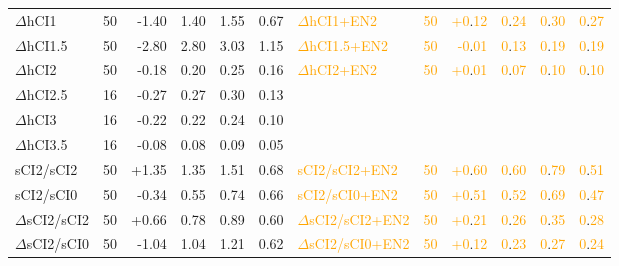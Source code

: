 \documentclass[aip,jcp,reprint,noshowkeys,superscriptaddress]{revtex4-1}
\newcommand{\fk}[1]{\textcolor{orange}{#1}}
\begin{document}
\begin{table}[ht!]
\begin{ruledtabular}
\begin{tabular}{ldddddlddddd}
%
\hline
$\Delta$hCI1      & 50  & -1.40 & 1.40 & 1.55 & 0.67  &\fk{$\Delta$hCI1+EN2}      & \fk{50}  & \fk{+0}.\fk{12}  & \fk{0}.\fk{24} & \fk{0}.\fk{30} & \fk{0}.\fk{27} \\
$\Delta$hCI1.5    & 50  & -2.80 & 2.80 & 3.03 & 1.15  &\fk{$\Delta$hCI1.5+EN2}    & \fk{50}  & \fk{-0}.\fk{01}  & \fk{0}.\fk{13} & \fk{0}.\fk{19} & \fk{0}.\fk{19} \\
$\Delta$hCI2      & 50  & -0.18 & 0.20 & 0.25 & 0.16  &\fk{$\Delta$hCI2+EN2}      & \fk{50}  & \fk{+0}.\fk{01}  & \fk{0}.\fk{07} & \fk{0}.\fk{10} & \fk{0}.\fk{10} \\
$\Delta$hCI2.5    & 16  & -0.27 & 0.27 & 0.30 & 0.13  & & & & & & \\
$\Delta$hCI3      & 16  & -0.22 & 0.22 & 0.24 & 0.10  & & & & & & \\
$\Delta$hCI3.5    & 16  & -0.08 & 0.08 & 0.09 & 0.05  & & & & & & \\
%
\hline
sCI2/sCI2         & 50  & +1.35 & 1.35 & 1.51 & 0.68  &\fk{sCI2/sCI2+EN2}         & \fk{50}  & \fk{+0}.\fk{60}  & \fk{0}.\fk{60} & \fk{0}.\fk{79} & \fk{0}.\fk{51} \\
sCI2/sCI0         & 50  & -0.34 & 0.55 & 0.74 & 0.66  &\fk{sCI2/sCI0+EN2}         & \fk{50}  & \fk{+0}.\fk{51}  & \fk{0}.\fk{52} & \fk{0}.\fk{69} & \fk{0}.\fk{47} \\
$\Delta$sCI2/sCI2 & 50  & +0.66 & 0.78 & 0.89 & 0.60  &\fk{$\Delta$sCI2/sCI2+EN2} & \fk{50}  & \fk{+0}.\fk{21}  & \fk{0}.\fk{26} & \fk{0}.\fk{35} & \fk{0}.\fk{28} \\
$\Delta$sCI2/sCI0 & 50  & -1.04 & 1.04 & 1.21 & 0.62  &\fk{$\Delta$sCI2/sCI0+EN2} & \fk{50}  & \fk{+0}.\fk{12}  & \fk{0}.\fk{23} & \fk{0}.\fk{27} & \fk{0}.\fk{24} \\
%
\end{tabular}
\end{ruledtabular}
\end{table}
\end{document}
